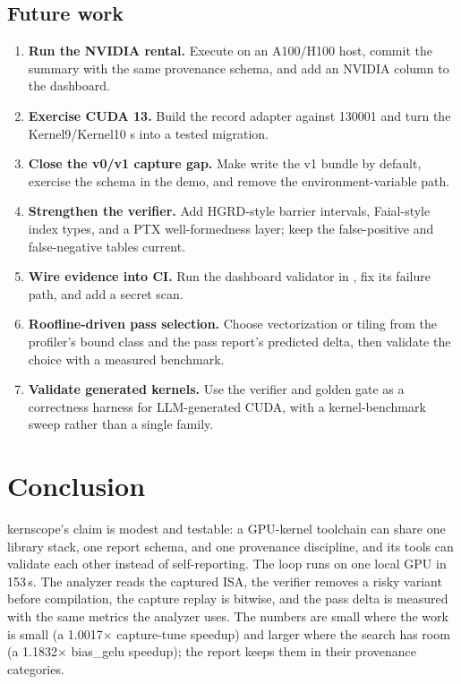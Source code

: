 \subsection{Future work}
\label{sec:future}

\begin{enumerate}
  \item \textbf{Run the NVIDIA rental.} Execute  on an
        A100/H100 host, commit the summary with the same provenance schema, and
        add an NVIDIA column to the dashboard.
  \item \textbf{Exercise CUDA 13.} Build the record adapter against
         130001 and turn the Kernel9/Kernel10
        s into a tested migration.
  \item \textbf{Close the v0/v1 capture gap.} Make  write the v1
        bundle by default, exercise the schema in the demo, and remove the
        environment-variable path.
  \item \textbf{Strengthen the verifier.} Add HGRD-style barrier intervals,
        Faial-style index types, and a PTX well-formedness layer; keep the
        false-positive and false-negative tables current.
  \item \textbf{Wire evidence into CI.} Run the dashboard validator in
        , fix its failure path, and add a secret scan.
  \item \textbf{Roofline-driven pass selection.} Choose vectorization or tiling
        from the profiler's bound class and the pass report's predicted delta,
        then validate the choice with a measured benchmark.
  \item \textbf{Validate generated kernels.} Use the verifier and golden gate
        as a correctness harness for LLM-generated CUDA, with a kernel-benchmark
        sweep rather than a single family.
\end{enumerate}

\section{Conclusion}
\label{sec:conclusion}

kernscope's claim is modest and testable: a GPU-kernel toolchain can share one
library stack, one report schema, and one provenance discipline, and its tools
can validate each other instead of self-reporting. The loop runs on one local
GPU in 153\,s. The analyzer reads the captured ISA, the verifier removes a
risky variant before compilation, the capture replay is bitwise, and the pass
delta is measured with the same metrics the analyzer uses. The numbers are
small where the work is small (a 1.0017$\times$ capture-tune speedup) and
larger where the search has room (a 1.1832$\times$ bias\_gelu speedup); the
report keeps them in their provenance categories.

